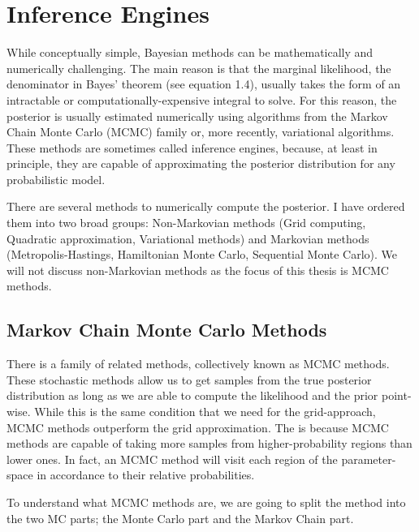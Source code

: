 \chapter{Inference Engines}\label{chap:infeng}

While conceptually simple, Bayesian methods can be mathematically and numerically challenging. The main reason is that the marginal likelihood, the denominator in Bayes' theorem (see equation 1.4), usually takes the form of an intractable or computationally-expensive integral to solve. For this reason, the posterior is usually estimated numerically using algorithms from the Markov Chain Monte Carlo (MCMC) family or, more recently, variational algorithms. These methods are sometimes called inference engines, because, at least in principle, they are capable of approximating the posterior distribution for any probabilistic model. 

There are several methods to numerically compute the posterior. I have ordered them into two broad groups: Non-Markovian methods (Grid computing, Quadratic approximation, Variational methods) and Markovian methods (Metropolis-Hastings, Hamiltonian Monte Carlo, Sequential Monte Carlo). We will not discuss non-Markovian methods as the focus of this thesis is MCMC methods.

\section{Markov Chain Monte Carlo Methods}

There is a family of related methods, collectively known as MCMC methods. These stochastic methods allow us to get samples from the true posterior distribution as long as we are able to compute the likelihood and the prior point-wise. While this is the same condition that we need for the grid-approach, MCMC methods outperform the grid approximation. The is because MCMC methods are capable of taking more samples from higher-probability regions than lower ones. In fact, an MCMC method will visit each region of the parameter-space in accordance to their relative probabilities.

To understand what MCMC methods are, we are going to split the method into the two MC parts; the Monte Carlo part and the Markov Chain part.



